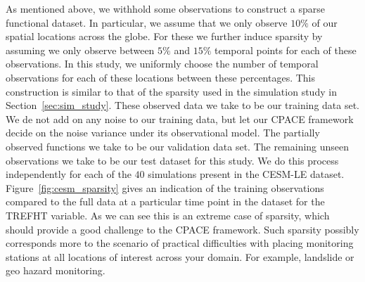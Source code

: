 As mentioned above, we withhold some observations to construct a sparse functional dataset. 
In particular, we assume that we only observe $10\%$ of our spatial locations across the globe.
For these we further induce sparsity by assuming we only observe between $5\%$ and $15\%$ temporal points for each of these observations.
In this study, we uniformly choose the number of temporal observations for each of these locations between these percentages.
This construction is similar to that of the sparsity used in the simulation study in Section~\ref{sec:sim_study}.
These observed data we take to be our training data set.
We de not add on any noise to our training data, but let our CPACE framework decide on the noise variance under its observational model.
The partially observed functions we take to be our validation data set.
The remaining unseen observations we take to be our test dataset for this study.
We do this process independently for each of the $40$ simulations present in the CESM-LE dataset.
Figure~\ref{fig:cesm_sparsity} gives an indication of the training observations compared to the full data at a particular time point in the dataset for the TREFHT variable.
As we can see this is an extreme case of sparsity, which should provide a good challenge to the CPACE framework.
Such sparsity possibly corresponds more to the scenario of practical difficulties with placing monitoring stations at all locations of interest across your domain.
For example, landslide or geo hazard monitoring.

